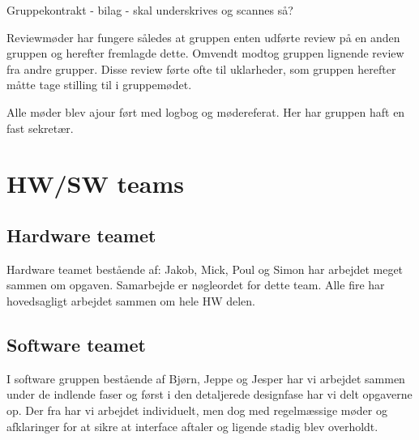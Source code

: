 Gruppekontrakt - bilag - skal underskrives og scannes så?

Reviewmøder har fungere således at gruppen enten udførte review på en anden gruppen og herefter fremlagde dette. Omvendt modtog gruppen lignende review fra andre grupper. Disse review førte ofte til uklarheder, som gruppen herefter måtte tage stilling til i gruppemødet.

Alle møder blev ajour ført med logbog og mødereferat. Her har gruppen haft en fast sekretær. 

\section{HW/SW teams}

\subsection{Hardware teamet}
Hardware teamet bestående af: Jakob, Mick, Poul og Simon har arbejdet meget sammen om opgaven. Samarbejde er nøgleordet for dette team. Alle fire har hovedsagligt arbejdet sammen om hele HW delen. 

\subsection{Software teamet}
I software gruppen bestående af Bjørn, Jeppe og Jesper har vi arbejdet sammen under de indlende faser og først i den detaljerede designfase har vi delt opgaverne op.
Der fra har vi arbejdet individuelt, men dog med regelmæssige møder og afklaringer for at sikre at interface aftaler og ligende stadig blev overholdt.

